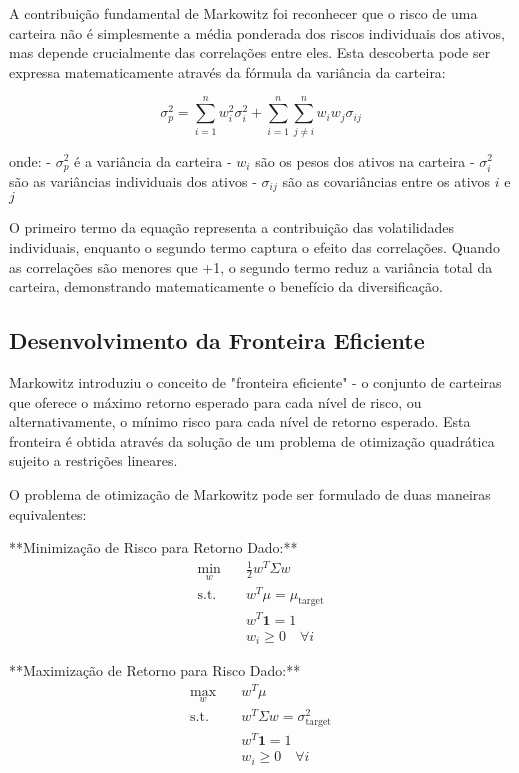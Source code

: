A contribuição fundamental de Markowitz foi reconhecer que o risco de uma carteira não é simplesmente a média ponderada dos riscos individuais dos ativos, mas depende crucialmente das correlações entre eles. Esta descoberta pode ser expressa matematicamente através da fórmula da variância da carteira:

\begin{equation}
\sigma_p^2 = \sum_{i=1}^{n} w_i^2 \sigma_i^2 + \sum_{i=1}^{n} \sum_{j \neq i}^{n} w_i w_j \sigma_{ij}
\end{equation}

onde:
- $\sigma_p^2$ é a variância da carteira
- $w_i$ são os pesos dos ativos na carteira
- $\sigma_i^2$ são as variâncias individuais dos ativos
- $\sigma_{ij}$ são as covariâncias entre os ativos $i$ e $j$

O primeiro termo da equação representa a contribuição das volatilidades individuais, enquanto o segundo termo captura o efeito das correlações. Quando as correlações são menores que +1, o segundo termo reduz a variância total da carteira, demonstrando matematicamente o benefício da diversificação.

\subsection{Desenvolvimento da Fronteira Eficiente}

Markowitz introduziu o conceito de "fronteira eficiente" - o conjunto de carteiras que oferece o máximo retorno esperado para cada nível de risco, ou alternativamente, o mínimo risco para cada nível de retorno esperado. Esta fronteira é obtida através da solução de um problema de otimização quadrática sujeito a restrições lineares.

O problema de otimização de Markowitz pode ser formulado de duas maneiras equivalentes:

**Minimização de Risco para Retorno Dado:**
\begin{align}
\min_w \quad & \frac{1}{2} w^T \Sigma w \\
\text{s.t.} \quad & w^T \mu = \mu_{\text{target}} \\
& w^T \mathbf{1} = 1 \\
& w_i \geq 0 \quad \forall i
\end{align}

**Maximização de Retorno para Risco Dado:**
\begin{align}
\max_w \quad & w^T \mu \\
\text{s.t.} \quad & w^T \Sigma w = \sigma_{\text{target}}^2 \\
& w^T \mathbf{1} = 1 \\
& w_i \geq 0 \quad \forall i
\end{align}

